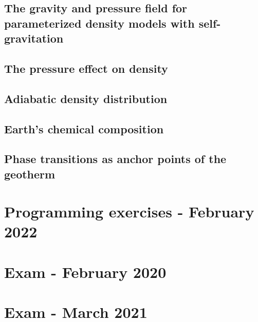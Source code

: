\subsection{The gravity and pressure field for parameterized density models with self-gravitation}
\label{sect_param_densmod}  %
\subsection{The pressure effect on density} %
\label{Pressure_density}  %
\subsection{Adiabatic density distribution} %
\label{Adiabatic density distribution}  %
\subsection{Earth's chemical composition} %
\label{section-chemical-composition}  %
\subsection{Phase transitions as anchor points of the geotherm} %
\label{section-anchor points}  %

\newpage
\section{Programming exercises - February 2022 \label{exgravptmass}} 

\newpage
\section{Exam - February 2020} 
\newpage
\section{Exam - March 2021} 

